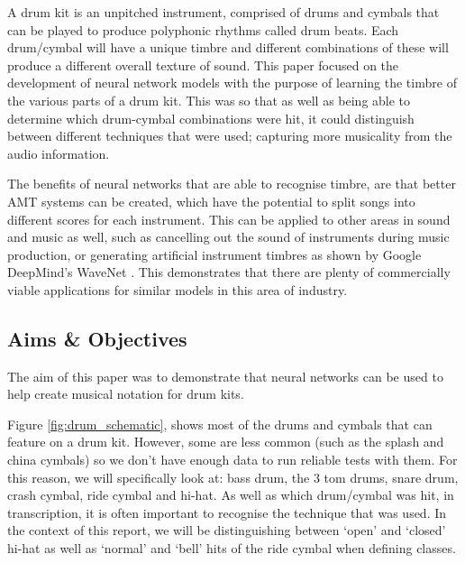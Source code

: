 \documentclass[12pt]{article}
\begin{document}
	A drum kit is an unpitched instrument, comprised of drums and cymbals that can be played to produce polyphonic rhythms called drum beats. Each drum/cymbal will have a unique timbre and different combinations of these will produce a different overall texture of sound. This paper focused on the development of neural network models with the purpose of learning the timbre of the various parts of a drum kit. This was so that as well as being able to determine which drum-cymbal combinations were hit, it could distinguish between different techniques that were used; capturing more musicality from the audio information.\medskip
	
	The benefits of neural networks that are able to recognise timbre, are that better AMT systems can be created, which have the potential to split songs into different scores for each instrument. This can be applied to other areas in sound and music as well, such as cancelling out the sound of instruments during music production, or generating artificial instrument timbres as shown by Google DeepMind's WaveNet \parencite{Oord2016}. This demonstrates that there are plenty of commercially viable applications for similar models in this area of industry.
	
	\newpage
	\subsection{Aims \& Objectives}
	\label{sec:aim_and_obj}
	The aim of this paper was to demonstrate that neural networks can be used to help create musical notation for drum kits. \medskip
	
	Figure \ref{fig:drum_schematic}, shows most of the drums and cymbals that can feature on a drum kit. However, some are less common (such as the splash and china cymbals) so we don't have enough data to run reliable tests with them. For this reason, we will specifically look at: bass drum, the 3 tom drums, snare drum, crash cymbal, ride cymbal and hi-hat. As well as which drum/cymbal was hit, in transcription, it is often important to recognise the technique that was used. In the context of this report, we will be distinguishing between `open' and `closed' hi-hat as well as `normal' and `bell' hits of the ride cymbal when defining classes.\medskip
	
\end{document}
